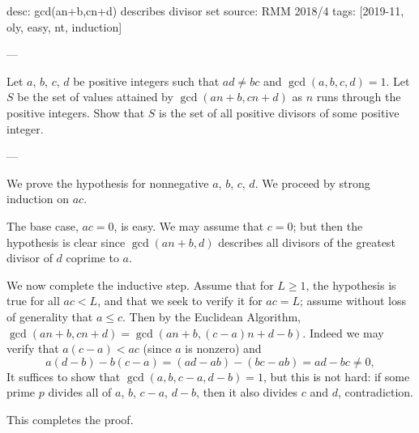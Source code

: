 desc: gcd(an+b,cn+d) describes divisor set
source: RMM 2018/4
tags: [2019-11, oly, easy, nt, induction]

---

Let $a$, $b$, $c$, $d$ be positive integers such that $ad\ne bc$ and $\gcd(a,b,c,d)=1$. Let $S$ be the set of values attained by $\gcd(an+b,cn+d)$ as $n$ runs through the positive integers. Show that $S$ is the set of all positive divisors of some positive integer.

---

We prove the hypothesis for nonnegative $a$, $b$, $c$, $d$. We proceed by strong induction on $ac$.

The base case, $ac=0$, is easy. We may assume that $c=0$; but then the hypothesis is clear since $\gcd(an+b,d)$ describes all divisors of the greatest divisor of $d$ coprime to $a$.

We now complete the inductive step. Assume that for $L\ge1$, the hypothesis is true for all $ac<L$, and that we seek to verify it for $ac=L$; assume without loss of generality that $a\le c$. Then by the Euclidean Algorithm, $\gcd(an+b,cn+d)=\gcd(an+b,(c-a)n+d-b)$. Indeed we may verify that $a(c-a)<ac$ (since $a$ is nonzero) and \[a(d-b)-b(c-a)=(ad-ab)-(bc-ab)=ad-bc\ne0,\]
It suffices to show that $\gcd(a,b,c-a,d-b)=1$, but this is not hard: if some prime $p$ divides all of $a$, $b$, $c-a$, $d-b$, then it also divides $c$ and $d$, contradiction.

This completes the proof.
